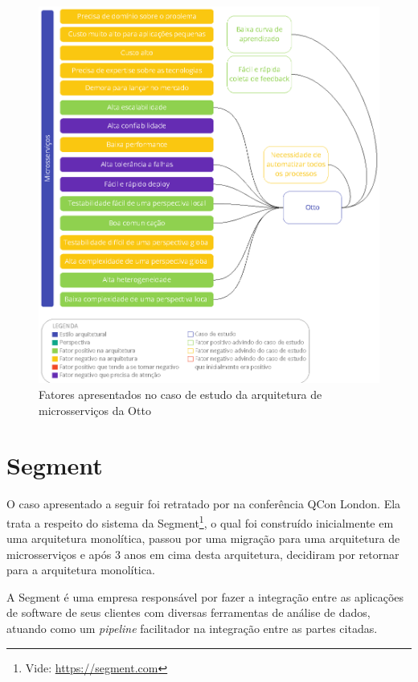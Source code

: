 \begin{figure}[h]
  \centering
  \includegraphics[keepaspectratio=true,scale=1]{figuras/analise-micro-otto.eps}
  \caption{Fatores apresentados no caso de estudo da arquitetura de microsserviços da Otto\label{fig:analise-micro-otto}}
\end{figure}

\section{Segment}

O caso apresentado a seguir foi retratado por  na
conferência QCon London. Ela trata a respeito do sistema da Segment\footnote{Vide:
\url{https://segment.com}}, o qual foi construído inicialmente em uma arquitetura monolítica,
passou por uma migração para uma arquitetura de microsserviços e após 3 anos em cima desta
arquitetura, decidiram por retornar para a arquitetura monolítica.

A Segment é uma empresa responsável por fazer a integração entre as aplicações de software de seus
clientes com diversas ferramentas de análise de dados, atuando como um \textit{pipeline} facilitador
na integração entre as partes citadas. 

